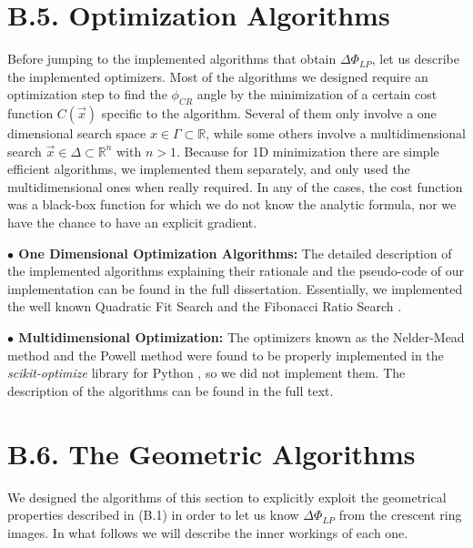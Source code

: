 \documentclass[11pt, a4paper, twoside]{article} %
\newcommand{\R}{\mathbb{R}} %
\begin{document}
\section*{B.5. Optimization Algorithms\vspace{-0.25cm}}
 Before jumping to the implemented algorithms that obtain $\Delta\Phi_{LP}$, let us describe the implemented optimizers. Most of the algorithms we designed require an optimization step to find the $\phi_{CR}$ angle by  the minimization of a certain cost function $C(\vec{x})$ specific to the algorithm. Several of them only involve a one dimensional search space $x\in\Gamma\subset\R$, while some others involve a multidimensional search $\vec{x}\in\Delta\subset \R^n$ with $n>1$. Because for 1D minimization there are simple efficient algorithms, we implemented them separately, and only used the multidimensional ones when really required. In any of the cases, the cost function was a black-box function for which we do not know the analytic formula, nor we have the chance to have an explicit gradient.\vspace{-0.1cm}

{\bf $\bullet$ One Dimensional Optimization Algorithms:} The detailed description of the implemented algorithms explaining their rationale and the pseudo-code of our implementation can be found in the full dissertation. Essentially, we implemented the well known Quadratic Fit Search \cite{opt} and the Fibonacci Ratio Search \cite{fibo}.\vspace{-0.05cm}

{\bf $\bullet$ Multidimensional Optimization:} The optimizers known as the Nelder-Mead method and the Powell method were found to be properly implemented in the {\em scikit-optimize} library for Python \cite{skopt}, so we did not implement them. The description of the algorithms can be found in the full text. \vspace{-0.15cm}

\section*{B.6. The Geometric Algorithms\vspace{-0.25cm}}
We designed the algorithms of this section to explicitly exploit the geometrical properties described in (B.1) in order to let us know $\Delta\Phi_{LP}$ from the crescent ring images. In what follows we will describe the inner workings of each one.\vspace{-0.3cm}
\end{document}
